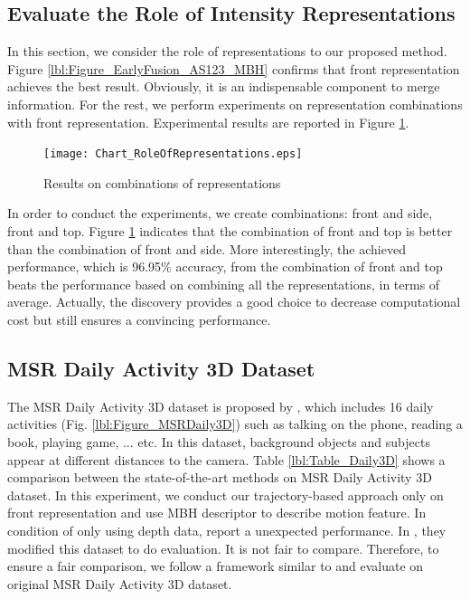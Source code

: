 \documentclass[review]{elsarticle}
\begin{document}
\subsection{Evaluate the Role of Intensity Representations}

In this section, we consider the role of representations to our proposed method. Figure \ref{lbl:Figure_EarlyFusion_AS123_MBH} confirms that front representation achieves the best result. Obviously, it is an indispensable component to merge information. For the rest, we perform experiments on representation combinations with front representation. Experimental results are reported in Figure \ref{lbl:Figure_CombinationsFRONTSIDETOP}.

\begin{figure}[H]
	\begin{center}
		\texttt{[image: Chart\_RoleOfRepresentations.eps]}
	\end{center}
	\caption{\label{lbl:Figure_CombinationsFRONTSIDETOP}Results on combinations of representations}
\end{figure}

In order to conduct the experiments, we create combinations: front and side, front and top. Figure \ref{lbl:Figure_CombinationsFRONTSIDETOP} indicates that the combination of front and top is better than the combination of front and side. More interestingly, the achieved performance, which is 96.95\% accuracy, from the combination of front and top beats the performance based on combining all the representations, in terms of average. Actually, the discovery provides a good choice to decrease computational cost but still ensures a convincing performance.

\subsection{MSR Daily Activity 3D Dataset}

 The  MSR Daily Activity 3D dataset is proposed by \cite{wang2012mining}, which includes 16 daily activities  (Fig. \ref{lbl:Figure_MSRDaily3D}) such as talking on the phone, reading a book, playing game, ... etc. In this dataset, background objects and subjects appear at different distances to the camera. Table \ref{lbl:Table_Daily3D} shows a comparison between the state-of-the-art methods on MSR Daily Activity 3D dataset. In this experiment, we conduct our trajectory-based approach only on front representation and use MBH descriptor to describe motion feature. In condition of only using depth data, \cite{wang2012mining, oreifej2013hon4d, xia2013spatio} report a unexpected performance. In \cite{xia2013spatio}, they modified this dataset to do evaluation. It is not fair to compare. Therefore, to ensure a fair comparison, we follow a framework similar to \cite{xia2013spatio} and evaluate on original MSR Daily Activity 3D dataset.
 
\end{document}
